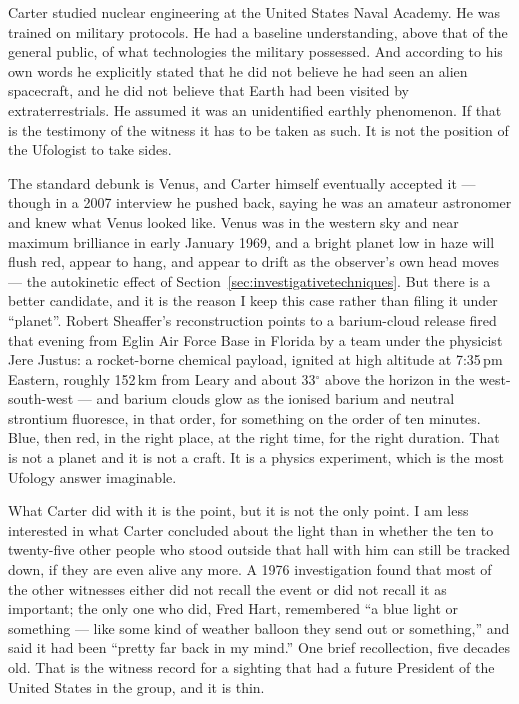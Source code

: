 Carter studied nuclear engineering at the United States Naval Academy. He was trained on
military protocols. He had a baseline understanding, above that of the general public, of what
technologies the military possessed. And according to his own words he explicitly stated that he
did not believe he had seen an alien spacecraft, and he did not believe that Earth had been
visited by extraterrestrials. He assumed it was an unidentified earthly phenomenon. If that is
the testimony of the witness it has to be taken as such. It is not the position of the
Ufologist to take sides.

The standard debunk is Venus, and Carter himself eventually accepted it --- though in a 2007
interview he pushed back, saying he was an amateur astronomer and knew what Venus looked like.
Venus was in the western sky and near maximum brilliance in early January 1969, and a bright
planet low in haze will flush red, appear to hang, and appear to drift as the observer's own
head moves --- the autokinetic effect of Section~\ref{sec:investigativetechniques}. But there
is a better candidate, and it is the reason I keep this case rather than filing it under
``planet''. Robert Sheaffer's reconstruction points to a barium-cloud release fired that evening
from Eglin Air Force Base in Florida by a team under the physicist Jere Justus: a rocket-borne
chemical payload, ignited at high altitude at 7:35\,pm Eastern, roughly 152\,km from Leary and
about 33$^\circ$ above the horizon in the west-south-west --- and barium clouds glow
 as the ionised barium and neutral strontium fluoresce, in
that order, for something on the order of ten minutes. Blue, then red, in the right place, at
the right time, for the right duration. That is not a planet and it is not a craft. It is a
physics experiment, which is the most Ufology answer imaginable.

What Carter did with it is the point, but it is not the only point. I am less interested in
what Carter concluded about the light than in whether the ten to twenty-five other people who
stood outside that hall with him can still be tracked down, if they are even alive any more.
A 1976 investigation found that most of the other witnesses either did not recall the event or
did not recall it as important; the only one who did, Fred Hart, remembered ``a blue light or
something --- like some kind of weather balloon they send out or something,'' and said it had
been ``pretty far back in my mind.'' One brief recollection, five decades old. That is the
witness record for a sighting that had a future President of the United States in the group,
and it is thin.


